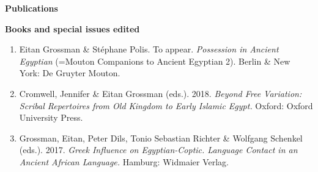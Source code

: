 \documentclass[letterpaper,11pt]{article}
\newcommand{\resheading}[1]{
\vspace*{6pt}
{\large \colorbox{mygrey}{\begin{minipage}{\textwidth}{\textbf{#1 \vphantom{p\^{E}}}}\end{minipage}}}
}
\begin{document}
\newpage
\resheading{Publications} 
\vspace*{6pt}
\hspace*{-10.5pt}
\vspace*{6pt}
\resheading{Books and special issues edited}
\begin{enumerate}


\item {Eitan Grossman \& St\'ephane Polis.} {To appear.} \textit{Possession in Ancient Egyptian} (=Mouton Companions to Ancient Egyptian 2). Berlin \& New York: De Gruyter Mouton.

\item {Cromwell, Jennifer \& Eitan Grossman (eds.).} {2018.} \textit{Beyond Free Variation: Scribal Repertoires from Old Kingdom to Early Islamic Egypt.} Oxford: Oxford University Press. 

\item {Grossman, Eitan, Peter Dils, Tonio Sebastian Richter \& Wolfgang Schenkel (eds.).} {2017.} \textit{Greek Influence on Egyptian-Coptic. Language Contact in an Ancient African Language.} Hamburg: Widmaier Verlag.


\end{enumerate}
\end{document}
